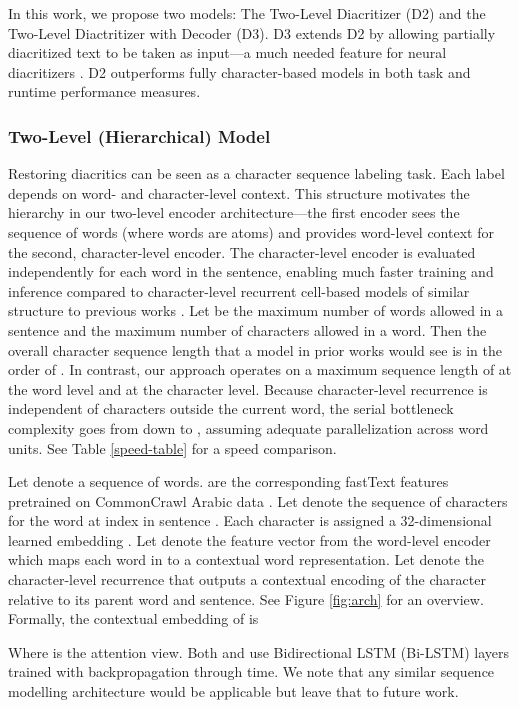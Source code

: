 \documentclass[11pt]{article}
\begin{document}
In this work, we propose two models: The Two-Level Diacritizer (D2) and the Two-Level Diactritizer with Decoder (D3). D3 extends D2 by allowing partially diacritized text to be taken as input---a much needed feature for neural diacritizers \cite{fadel19}. D2 outperforms fully character-based models in both task and runtime performance measures.
\subsubsection{Two-Level (Hierarchical) Model}
\label{arch:hie}
Restoring diacritics can be seen as a character sequence labeling task. Each label depends on word- and character-level context. This structure motivates the hierarchy in our two-level encoder architecture---the first encoder sees the sequence of words (where words are atoms) and provides word-level context for the second, character-level encoder. The character-level encoder is evaluated independently for each word in the sentence, enabling much faster training and inference compared to character-level recurrent cell-based models of similar structure to previous works \cite{belinkov-glass-2015-arabic,mubarak19-highly,joint2020,fadel19-neural}. Let  be the maximum number of words allowed in a sentence and  the maximum number of characters allowed in a word. Then the overall character sequence length that a model in prior works would see is in the order of . In contrast, our approach operates on a maximum sequence length of  at the word level and  at the character level. Because character-level recurrence is independent of characters outside the current word, the serial bottleneck complexity goes from  down to , assuming adequate parallelization across word units. See Table \ref{speed-table} for a speed comparison.

Let  denote a sequence of words.  are the corresponding fastText features pretrained on CommonCrawl Arabic data \cite{fastText17}. Let  denote the sequence of characters for the word at index  in sentence . Each character is assigned a 32-dimensional learned embedding . Let  denote the feature vector from the word-level encoder which maps each word in  to a contextual word representation. Let  denote the character-level recurrence that
outputs a contextual encoding of the character relative to its parent word and sentence. See Figure \ref{fig:arch} for an overview. Formally, the contextual embedding  of  is

Where  is the attention view. Both  and  use Bidirectional LSTM (Bi-LSTM) layers \cite{graves05} trained with backpropagation through time. We note that any similar sequence modelling architecture would be applicable \cite{gru14,attention} but leave that to future work.
\end{document}
